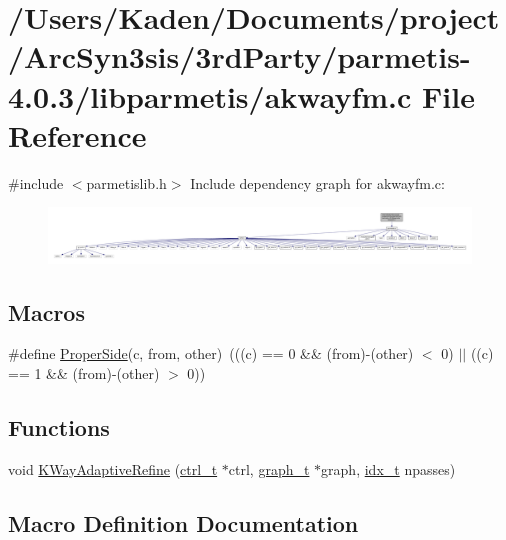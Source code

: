 \hypertarget{a00335}{}\section{/\+Users/\+Kaden/\+Documents/project/\+Arc\+Syn3sis/3rd\+Party/parmetis-\/4.0.3/libparmetis/akwayfm.c File Reference}
\label{a00335}
{\ttfamily \#include $<$parmetislib.\+h$>$}\newline
Include dependency graph for akwayfm.\+c\+:\nopagebreak
\begin{figure}[H]
\begin{center}
\leavevmode
\includegraphics[width=350pt]{a00336}
\end{center}
\end{figure}
\subsection*{Macros}
\begin{DoxyCompactItemize}
\item 
\#define \hyperlink{a00335_a0fc4274c04fd700ac3a3594ef91e15c7}{Proper\+Side}(c,  from,  other)~(((c) == 0 \&\& (from)-\/(other) $<$ 0) $\vert$$\vert$ ((c) == 1 \&\& (from)-\/(other) $>$ 0))
\end{DoxyCompactItemize}
\subsection*{Functions}
\begin{DoxyCompactItemize}
\item 
void \hyperlink{a00335_a2183d39c5ec7859f1e28e4d2693bd965}{K\+Way\+Adaptive\+Refine} (\hyperlink{a00742}{ctrl\+\_\+t} $\ast$ctrl, \hyperlink{a00734}{graph\+\_\+t} $\ast$graph, \hyperlink{a00876_aaa5262be3e700770163401acb0150f52}{idx\+\_\+t} npasses)
\end{DoxyCompactItemize}


\subsection{Macro Definition Documentation}
\mbox{\label{a00335_a0fc4274c04fd700ac3a3594ef91e15c7}} 
